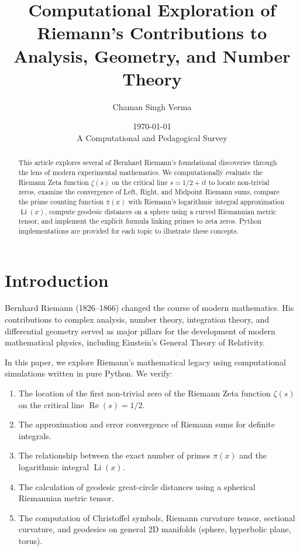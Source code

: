 \documentclass[11pt]{amsart}
\title[Computational Exploration of Riemann's Work]{Computational Exploration of Riemann's Contributions to Analysis, Geometry, and Number Theory}
\date{\today \\[6pt] \normalsize A Computational and Pedagogical Survey}
\author{Chaman Singh Verma}
\theoremstyle{definition}
\begin{document}
\begin{abstract}
This article explores several of Bernhard Riemann's foundational discoveries through the lens of modern experimental mathematics. We computationally evaluate the Riemann Zeta function $\zeta(s)$ on the critical line $s = 1/2 + it$ to locate non-trivial zeros, examine the convergence of Left, Right, and Midpoint Riemann sums, compare the prime counting function $\pi(x)$ with Riemann's logarithmic integral approximation $\operatorname{Li}(x)$, compute geodesic distances on a sphere using a curved Riemannian metric tensor, and implement the explicit formula linking primes to zeta zeros. Python implementations are provided for each topic to illustrate these concepts.
\end{abstract}

\maketitle

\section{Introduction}
\label{sec:intro}

Bernhard Riemann (1826--1866) changed the course of modern mathematics. His contributions to complex analysis, number theory, integration theory, and differential geometry served as major pillars for the development of modern mathematical physics, including Einstein's General Theory of Relativity.

In this paper, we explore Riemann's mathematical legacy using computational simulations written in pure Python. We verify:
\begin{enumerate}
    \item The location of the first non-trivial zero of the Riemann Zeta function $\zeta(s)$ on the critical line $\operatorname{Re}(s) = 1/2$.
    \item The approximation and error convergence of Riemann sums for definite integrals.
    \item The relationship between the exact number of primes $\pi(x)$ and the logarithmic integral $\operatorname{Li}(x)$.
    \item The calculation of geodesic great-circle distances using a spherical Riemannian metric tensor.
    \item The computation of Christoffel symbols, Riemann curvature tensor, sectional curvature, and geodesics on general 2D manifolds (sphere, hyperbolic plane, torus).
\end{enumerate}
\end{document}
